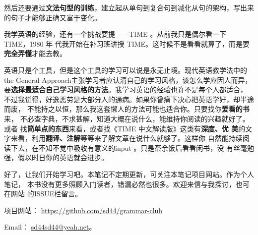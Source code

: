然后还要通过\textbf{文法句型的训练}，建立起从单句到复合句到减化从句的架构，写出来
的句子才能够正确又富于变化。

我学英语的经验，还有一个挑战要提——TIME 。从前我只是偶尔看一下 TIME，1980 年
代我开始在补习班讲授 TIME。这时候不是看看就算了，而是要\textbf{完全弄懂}才能去教。

英语只是个工具，但是这个工具的学习可以说是永无止境。现代英语教学法中的the
General Approach主张学习者应认清自己的学习风格，该怎么学应因人而异，
要\textbf{选择最适合自己学习风格的方法}。我学习英语的经验也许不是每个人都适合，
不过我觉得，好逸恶劳是大部分人的通病。如果你曾痛下决心把英语学好，却半途而废，
不能持之以恒，那么我这套懒人的方法可能也适合你。只要找你\textbf{爱看的书}来，
不必查字典，不求甚解，知道大概在说什么，能维持你阅读的兴趣就好了。或者
找\textbf{简单点的东西}来看，或者找《TIME 中文解读版》这类有\textbf{深度、优
  美}的文字来看，利用\textbf{翻译、注解}等等来了解文章在说什么就够了。这样你
自然能持续阅读下去，在不知不觉中吸收有意义的input 。只是茶余饭后看看闲书，没
有丝毫勉强，假以时日你的英语就会进步。


好了，让我们开始学习吧。本笔记不定期更新，可关注本笔记项目网站。作为个人笔记，
本书没有更多照顾入门读者，错漏必然也很多。欢迎来信与我探讨，也可在网站
的ISSUE栏留言。

项目网站： \href{https://github.com/sd44/grammar-club}{https://github.com/sd44/grammar-club}

Email： \href{mailto:sd44sd44@yeah.net}{sd44sd44@yeah.net}。



